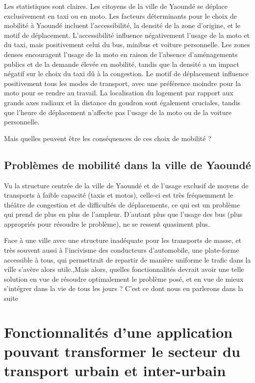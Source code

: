 \documentclass{article}
\begin{document}
Les statistiques sont claires. Les citoyens de la ville de Yaoundé se déplace exclusivement en taxi
 ou en moto. Les facteurs déterminants pour le choix de mobilité à Yaoundé incluent l’accessibilité, la densité de la zone d’origine, et le motif de déplacement. L’accessibilité influence négativement l’usage de la moto et du taxi, mais positivement celui du bus, minibus et voiture personnelle. Les zones denses encouragent l’usage de la moto en raison de l’absence d’aménagements publics et de la demande élevée en mobilité, tandis que la densité a un impact négatif sur le choix du taxi dû à la congestion. Le motif de déplacement influence positivement tous les modes de transport, avec une préférence moindre pour la moto pour se rendre au travail. La localisation du logement par rapport aux grands axes radiaux et la distance du goudron sont également cruciales, tandis que l’heure de déplacement n’affecte pas l’usage de la moto ou de la voiture personnelle.

 Mais quelles peuvent être les conséquences de ces choix de mobilité ?

 \subsection{Problèmes de mobilité dans la ville de Yaoundé}

Vu la structure centrée de la ville de Yaoundé et de l'usage exclusif de moyens de transports à faible capacité (taxis et motos), celle-ci est très fréquemment le théâtre de congestion et de difficultés de déplacements, ce qui est un problème qui prend de plus en plus de l'ampleur. D'autant plus que l'usage des bus (plus appropriés pour résoudre le problème), ne se ressent quasiment plus.

Face à une ville avec une structure inadéquate pour les transports de masse, et très souvent aussi à l'incivisme des conducteurs d'automobile, une plate-forme accessible à tous, qui permettrait de repartir de manière uniforme le trafic dans la ville s'avère alors utile.,Mais alors, quelles fonctionnalités devrait avoir une telle solution en vue de résoudre optimalement le problème posé, et en vue de mieux s'intégrer dans la vie de tous les jours ? C'est ce dont nous en parlerons dans la suite 

\section{Fonctionnalités d'une application pouvant transformer le secteur du transport urbain et inter-urbain}
\end{document}
